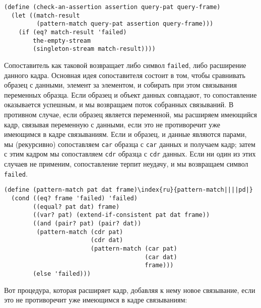 \begin{Verbatim}[fontsize=\small]
(define (check-an-assertion assertion query-pat query-frame)
  (let ((match-result
         (pattern-match query-pat assertion query-frame)))
    (if (eq? match-result 'failed)
        the-empty-stream
        (singleton-stream match-result))))
\end{Verbatim}
Сопоставитель как таковой возвращает либо символ {\tt failed},
либо расширение данного кадра.  Основная идея сопоставителя состоит в
том, чтобы сравнивать образец с данными, элемент за элементом, и
собирать при этом связывания переменных образца.  Если образец и
объект данных совпадают, то сопоставление оказывается
успешным, и мы возвращаем поток собранных связываний.  В противном
случае, если образец является переменной, мы расширяем имеющийся кадр,
связывая переменную с данными, если это не противоречит уже имеющимся
в кадре связываниям.  Если и образец, и данные являются парами, мы
(рекурсивно) сопоставляем {\tt car} образца с {\tt car}
данных и получаем кадр; затем с этим кадром мы сопоставляем
{\tt cdr} образца с {\tt cdr} данных.  Если ни один из
этих случаев не применим, сопоставление терпит неудачу, и мы
возвращаем символ {\tt failed}.

\begin{Verbatim}[fontsize=\small]
(define (pattern-match pat dat frame)\index{ru}{pattern-match||||pd|}
  (cond ((eq? frame 'failed) 'failed)
        ((equal? pat dat) frame)
        ((var? pat) (extend-if-consistent pat dat frame))
        ((and (pair? pat) (pair? dat))
         (pattern-match (cdr pat)
                        (cdr dat)
                        (pattern-match (car pat)
                                       (car dat)
                                       frame)))
        (else 'failed)))
\end{Verbatim}

Вот процедура, которая расширяет кадр, добавляя к нему
новое связывание, если это не противоречит уже имеющимся в кадре
связываниям:

